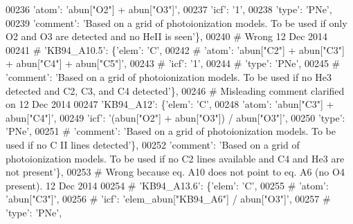 \begin{DoxyCode}
00236                                       \textcolor{stringliteral}{'atom'}: \textcolor{stringliteral}{'abun["O2"] + abun["O3"]'},
00237                                       \textcolor{stringliteral}{'icf'}: \textcolor{stringliteral}{'1'},
00238                                       \textcolor{stringliteral}{'type'}: \textcolor{stringliteral}{'PNe'},
00239                                       \textcolor{stringliteral}{'comment'}: \textcolor{stringliteral}{'Based on a grid of photoionization models. To be used if
       only O2 and O3 are detected and no HeII is seen'}\},
00240 \textcolor{comment}{# Wrong  12 Dec 2014}
00241 \textcolor{comment}{#                         'KB94\_A10.5': \{'elem': 'C',}
00242 \textcolor{comment}{#                                        'atom': 'abun["C2"] + abun["C3"] + abun["C4"] + abun["C5"]',}
00243 \textcolor{comment}{#                                        'icf': '1',}
00244 \textcolor{comment}{#                                        'type': 'PNe',}
00245 \textcolor{comment}{#                                        'comment': 'Based on a grid of photoionization models. To be used
       if no He3 detected and C2, C3, and C4 detected'\},}
00246 \textcolor{comment}{# Misleading comment clarified on 12 Dec 2014 }
00247                         \textcolor{stringliteral}{'KB94\_A12'}: \{\textcolor{stringliteral}{'elem'}: \textcolor{stringliteral}{'C'},
00248                                       \textcolor{stringliteral}{'atom'}: \textcolor{stringliteral}{'abun["C3"] + abun["C4"]'},
00249                                       \textcolor{stringliteral}{'icf'}: \textcolor{stringliteral}{'(abun["O2"] + abun["O3"]) / abun["O3"]'},
00250                                       \textcolor{stringliteral}{'type'}: \textcolor{stringliteral}{'PNe'},
00251 \textcolor{comment}{#                                      'comment': 'Based on a grid of photoionization models. To be used if
       no C II lines detected'\},}
00252                                       \textcolor{stringliteral}{'comment'}: \textcolor{stringliteral}{'Based on a grid of photoionization models. To be used if
       no C2 lines available and C4 and He3 are not present'}\},
00253 \textcolor{comment}{# Wrong because eq. A10 does not point to eq. A6 (no O4 present). 12 Dec 2014}
00254 \textcolor{comment}{#                         'KB94\_A13.6': \{'elem': 'C',}
00255 \textcolor{comment}{#                                      'atom': 'abun["C3"]',}
00256 \textcolor{comment}{#                                      'icf': 'elem\_abun["KB94\_A6"] / abun["O3"]',}
00257 \textcolor{comment}{#                                      'type': 'PNe',}

\end{DoxyCode}
